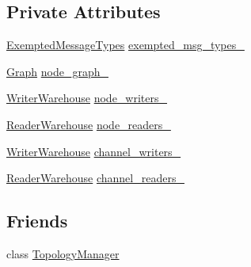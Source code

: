 \subsection*{Private Attributes}
\begin{DoxyCompactItemize}
\item 
\hyperlink{classapollo_1_1cyber_1_1service__discovery_1_1ChannelManager_a5ce07d9955d5944b039583db211c2d25}{Exempted\-Message\-Types} \hyperlink{classapollo_1_1cyber_1_1service__discovery_1_1ChannelManager_a673d2f5f6577c37ca44263f7a7295324}{exempted\-\_\-msg\-\_\-types\-\_\-}
\item 
\hyperlink{classapollo_1_1cyber_1_1service__discovery_1_1Graph}{Graph} \hyperlink{classapollo_1_1cyber_1_1service__discovery_1_1ChannelManager_aee4753f128f1a79a983e065c8775294a}{node\-\_\-graph\-\_\-}
\item 
\hyperlink{classapollo_1_1cyber_1_1service__discovery_1_1ChannelManager_ab34e0a39795d6002f20de1388e8e099b}{Writer\-Warehouse} \hyperlink{classapollo_1_1cyber_1_1service__discovery_1_1ChannelManager_a964857ce80f55467c86f0abd0dbf3419}{node\-\_\-writers\-\_\-}
\item 
\hyperlink{classapollo_1_1cyber_1_1service__discovery_1_1ChannelManager_adf7b96601a2dec7f06fb190d1a7b537d}{Reader\-Warehouse} \hyperlink{classapollo_1_1cyber_1_1service__discovery_1_1ChannelManager_aa021bd1e52a883766c5691ed2695bfb4}{node\-\_\-readers\-\_\-}
\item 
\hyperlink{classapollo_1_1cyber_1_1service__discovery_1_1ChannelManager_ab34e0a39795d6002f20de1388e8e099b}{Writer\-Warehouse} \hyperlink{classapollo_1_1cyber_1_1service__discovery_1_1ChannelManager_ac88e60402cb5f9799803f993a9c85138}{channel\-\_\-writers\-\_\-}
\item 
\hyperlink{classapollo_1_1cyber_1_1service__discovery_1_1ChannelManager_adf7b96601a2dec7f06fb190d1a7b537d}{Reader\-Warehouse} \hyperlink{classapollo_1_1cyber_1_1service__discovery_1_1ChannelManager_a14272c348659973742aae0a343ba1705}{channel\-\_\-readers\-\_\-}
\end{DoxyCompactItemize}
\subsection*{Friends}
\begin{DoxyCompactItemize}
\item 
class \hyperlink{classapollo_1_1cyber_1_1service__discovery_1_1ChannelManager_ae83aaddaeb682129a07c148e01291cdd}{Topology\-Manager}
\end{DoxyCompactItemize}
